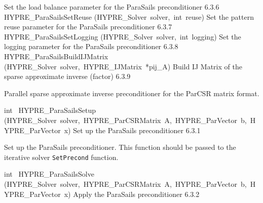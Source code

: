 \documentclass{article}
\begin{document}
\begin{cxxentry}
\begin{cxxentry}
\begin{cxxnames}
{Set the load balance parameter for the
ParaSails preconditioner}
        {6.3.6}
        {HYPRE\_ParaSailsSetReuse}
        {(HYPRE\_Solver\ solver,\ int\ reuse)}
        {
Set the pattern reuse parameter for the
ParaSails preconditioner}
        {6.3.7}
        {HYPRE\_ParaSailsSetLogging}
        {(HYPRE\_Solver\ solver,\ int\ logging)}
        {
Set the logging parameter for the
ParaSails preconditioner}
        {6.3.8}
        {HYPRE\_ParaSailsBuildIJMatrix}
        {(HYPRE\_Solver\ solver,\ HYPRE\_IJMatrix\ *pij\_A)}
        {
Build IJ Matrix of the sparse approximate inverse (factor)}
        {6.3.9}
\end{cxxnames}
\begin{cxxdoc}


Parallel sparse approximate inverse preconditioner for the
ParCSR matrix format.
\end{cxxdoc}
\begin{cxxfunction}
{int\ }
        {HYPRE\_ParaSailsSetup}
        {(HYPRE\_Solver\ solver,\ HYPRE\_ParCSRMatrix\ A,\ HYPRE\_ParVector\ b,\ HYPRE\_ParVector\ x)}
        {
Set up the ParaSails preconditioner}
        {6.3.1}
\begin{cxxdoc}

Set up the ParaSails preconditioner.  This function should be passed
to the iterative solver {\tt SetPrecond} function.


\end{cxxdoc}
\end{cxxfunction}
\begin{cxxfunction}
{int\ }
        {HYPRE\_ParaSailsSolve}
        {(HYPRE\_Solver\ solver,\ HYPRE\_ParCSRMatrix\ A,\ HYPRE\_ParVector\ b,\ HYPRE\_ParVector\ x)}
        {
Apply the ParaSails preconditioner}
        {6.3.2}
\begin{cxxdoc}


\end{cxxdoc}
\end{cxxfunction}
\end{cxxentry}
\end{cxxentry}
\end{document}
